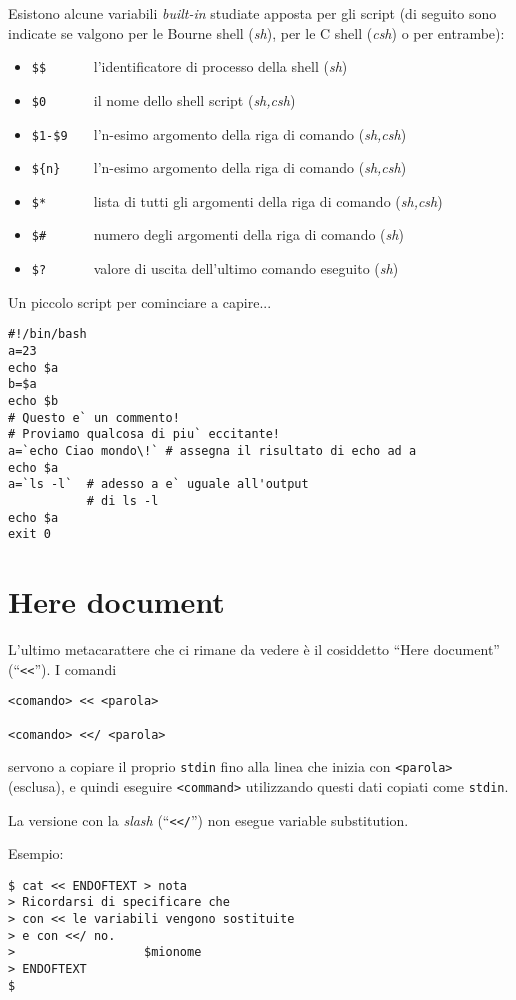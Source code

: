 Esistono alcune variabili \emph{built-in} studiate apposta per gli script (di
seguito sono indicate se valgono per le Bourne shell (\textit{sh}), per le C
shell (\textit{csh}) o per entrambe):
\begin{itemize}
	\item \texttt{\$\$\ \ \ \ \ \ } l'identificatore di processo della
		shell (\textit{sh})
	\item \texttt{\$0\ \ \ \ \ \ } il nome dello shell script
		(\textit{sh,csh})
	\item \texttt{\$1-\$9\ \ \ } l'n-esimo argomento della riga di comando
		(\textit{sh,csh})
	\item \texttt{\$\{n\}\ \ \ \ } l'n-esimo argomento della riga di
		comando (\textit{sh,csh})
	\item \texttt{\$*\ \ \ \ \ \ } lista di tutti gli argomenti della riga
		di comando (\textit{sh,csh})
	\item \texttt{\$\#\ \ \ \ \ \ } numero degli argomenti della riga di
		comando (\textit{sh})
	\item \texttt{\$?\ \ \ \ \ \ } valore di uscita dell'ultimo comando
		eseguito (\textit{sh})
\end{itemize}

Un piccolo script per cominciare a capire...
\begin{verbatim}
#!/bin/bash
a=23
echo $a
b=$a
echo $b
# Questo e` un commento!
# Proviamo qualcosa di piu` eccitante!
a=`echo Ciao mondo\!` # assegna il risultato di echo ad a
echo $a
a=`ls -l`  # adesso a e` uguale all'output
           # di ls -l
echo $a
exit 0
\end{verbatim}

\section{Here document}
L'ultimo metacarattere che ci rimane da vedere \`e il cosiddetto ``Here
document'' (``\texttt{<<}''). I comandi
\begin{verbatim}
<comando> << <parola>

<comando> <</ <parola>
\end{verbatim}
servono a copiare il proprio \texttt{stdin} fino alla linea che inizia con
\texttt{<parola>} (esclusa), e quindi eseguire \texttt{<command>} utilizzando
questi dati copiati come \texttt{stdin}.

La versione con la \textit{slash} (``\texttt{<</}'') non esegue variable
substitution.

Esempio:
\begin{verbatim}
$ cat << ENDOFTEXT > nota
> Ricordarsi di specificare che
> con << le variabili vengono sostituite
> e con <</ no.
>                  $mionome
> ENDOFTEXT
$ 
\end{verbatim}

